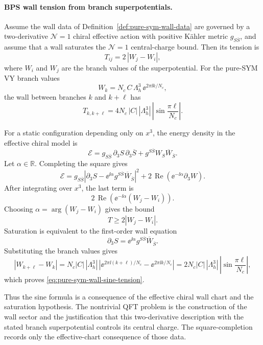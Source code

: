 \paragraph{BPS wall tension from branch superpotentials.}
Assume the wall data of Definition~\ref{def:pure-sym-wall-data} are governed
by a two-derivative \(\mathcal N=1\) chiral effective action with positive
Kähler metric \(g_{S\overline S}\), and assume that a wall saturates the
\(\mathcal N=1\) central-charge bound.  Then its tension is
\begin{equation}
  T_{ij}=2\,|W_j-W_i|,
  \label{eq:n1-bps-wall-tension-general}
\end{equation}
where \(W_i\) and \(W_j\) are the branch values of the superpotential.  For
the pure-SYM VY branch values
\[
  W_k=N_c\,C\,\Lambda_h^3\,\ee^{2\pi\ii k/N_c},
\]
the wall between branches \(k\) and \(k+\ell\) has
\begin{equation}
  T_{k,k+\ell}
  =
  4N_c\,|C|\,|\Lambda_h^3|\,
  \left|\sin\frac{\pi\ell}{N_c}\right|.
  \label{eq:pure-sym-wall-sine-tension}
\end{equation}

For a static configuration depending only on \(x^3\), the energy density in
the effective chiral model is
\[
  \mathcal E
  =
  g_{S\overline S}\,\partial_3S\,\partial_3\overline S
  +
  g^{S\overline S}W_S\overline W_{\overline S}.
\]
Let \(\alpha\in\mathbb R\).  Completing the square gives
\[
  \mathcal E
  =
  g_{S\overline S}
  \left|
    \partial_3S-\ee^{\ii\alpha}g^{S\overline S}\overline W_{\overline S}
  \right|^2
  +
  2\,\operatorname{Re}\!\left(
    \ee^{-\ii\alpha}\partial_3 W
  \right).
\]
After integrating over \(x^3\), the last term is
\[
  2\,\operatorname{Re}\!\left(
    \ee^{-\ii\alpha}(W_j-W_i)
  \right).
\]
Choosing \(\alpha=\arg(W_j-W_i)\) gives the bound
\[
  T\ge 2|W_j-W_i|.
\]
Saturation is equivalent to the first-order wall equation
\[
  \partial_3S=\ee^{\ii\alpha}g^{S\overline S}\overline W_{\overline S}.
\]
Substituting the branch values gives
\[
  |W_{k+\ell}-W_k|
  =
  N_c|C|\,|\Lambda_h^3|\,
  \left|\ee^{2\pi\ii(k+\ell)/N_c}-\ee^{2\pi\ii k/N_c}\right|
  =
  2N_c|C|\,|\Lambda_h^3|\,
  \left|\sin\frac{\pi\ell}{N_c}\right|,
\]
which proves \eqref{eq:pure-sym-wall-sine-tension}.

Thus the sine formula is a consequence of the effective chiral wall chart and
the saturation hypothesis.  The nontrivial QFT problem is the construction of
the wall sector and the justification that this two-derivative description
with the stated branch superpotential controls its central charge.  The
square-completion records only the effective-chart consequence of those data.

